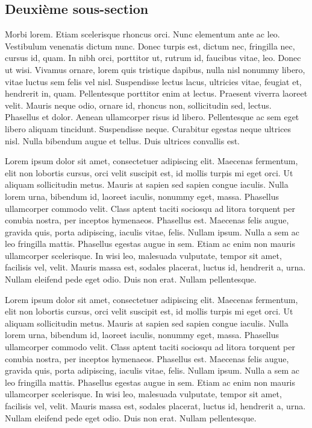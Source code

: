 \subsection{Deuxième sous-section}

Morbi lorem. Etiam scelerisque rhoncus orci. Nunc elementum ante ac leo. Vestibulum venenatis dictum nunc. Donec turpis est, dictum nec, fringilla nec, cursus id, quam. In nibh orci, porttitor ut, rutrum id, faucibus vitae, leo. Donec ut wisi. Vivamus ornare, lorem quis tristique dapibus, nulla nisl nonummy libero, vitae luctus sem felis vel nisl. Suspendisse lectus lacus, ultricies vitae, feugiat et, hendrerit in, quam. Pellentesque porttitor enim at lectus. Praesent viverra laoreet velit. Mauris neque odio, ornare id, rhoncus non, sollicitudin sed, lectus. Phasellus et dolor. Aenean ullamcorper risus id libero. Pellentesque ac sem eget libero aliquam tincidunt. Suspendisse neque. Curabitur egestas neque ultrices nisl. Nulla bibendum augue et tellus. Duis ultrices convallis est.

Lorem ipsum dolor sit amet, consectetuer adipiscing elit. Maecenas fermentum, elit non lobortis cursus, orci velit suscipit est, id mollis turpis mi eget orci. Ut aliquam sollicitudin metus. Mauris at sapien sed sapien congue iaculis. Nulla lorem urna, bibendum id, laoreet iaculis, nonummy eget, massa. Phasellus ullamcorper commodo velit. Class aptent taciti sociosqu ad litora torquent per conubia nostra, per inceptos hymenaeos. Phasellus est. Maecenas felis augue, gravida quis, porta adipiscing, iaculis vitae, felis. Nullam ipsum. Nulla a sem ac leo fringilla mattis. Phasellus egestas augue in sem. Etiam ac enim non mauris ullamcorper scelerisque. In wisi leo, malesuada vulputate, tempor sit amet, facilisis vel, velit. Mauris massa est, sodales placerat, luctus id, hendrerit a, urna. Nullam eleifend pede eget odio. Duis non erat. Nullam pellentesque.

Lorem ipsum dolor sit amet, consectetuer adipiscing elit. Maecenas fermentum, elit non lobortis cursus, orci velit suscipit est, id mollis turpis mi eget orci. Ut aliquam sollicitudin metus. Mauris at sapien sed sapien congue iaculis. Nulla lorem urna, bibendum id, laoreet iaculis, nonummy eget, massa. Phasellus ullamcorper commodo velit. Class aptent taciti sociosqu ad litora torquent per conubia nostra, per inceptos hymenaeos. Phasellus est. Maecenas felis augue, gravida quis, porta adipiscing, iaculis vitae, felis. Nullam ipsum. Nulla a sem ac leo fringilla mattis. Phasellus egestas augue in sem. Etiam ac enim non mauris ullamcorper scelerisque. In wisi leo, malesuada vulputate, tempor sit amet, facilisis vel, velit. Mauris massa est, sodales placerat, luctus id, hendrerit a, urna. Nullam eleifend pede eget odio. Duis non erat. Nullam pellentesque.

